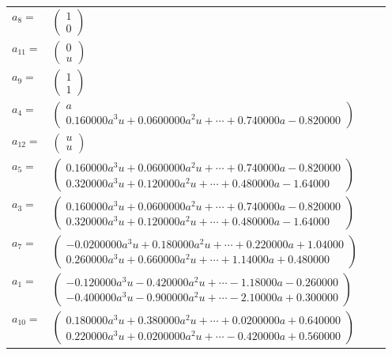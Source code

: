 \documentclass[1p]{elsarticle_modified}
\theoremstyle{definition}
\begin{document}
\begin{tabular}{m{7pt} m{180pt} m{7pt} m{180pt} }
\flushright $a_{8}=$&$\begin{pmatrix}1\\0\end{pmatrix}$ \\
\flushright $a_{11}=$&$\begin{pmatrix}0\\u\end{pmatrix}$ \\
\flushright $a_{9}=$&$\begin{pmatrix}1\\1\end{pmatrix}$ \\
\flushright $a_{4}=$&$\begin{pmatrix}a\\0.160000 a^{3} u+0.0600000 a^{2} u+\cdots+0.740000 a-0.820000\end{pmatrix}$ \\
\flushright $a_{12}=$&$\begin{pmatrix}u\\u\end{pmatrix}$ \\
\flushright $a_{5}=$&$\begin{pmatrix}0.160000 a^{3} u+0.0600000 a^{2} u+\cdots+0.740000 a-0.820000\\0.320000 a^{3} u+0.120000 a^{2} u+\cdots+0.480000 a-1.64000\end{pmatrix}$ \\
\flushright $a_{3}=$&$\begin{pmatrix}0.160000 a^{3} u+0.0600000 a^{2} u+\cdots+0.740000 a-0.820000\\0.320000 a^{3} u+0.120000 a^{2} u+\cdots+0.480000 a-1.64000\end{pmatrix}$ \\
\flushright $a_{7}=$&$\begin{pmatrix}-0.0200000 a^{3} u+0.180000 a^{2} u+\cdots+0.220000 a+1.04000\\0.260000 a^{3} u+0.660000 a^{2} u+\cdots+1.14000 a+0.480000\end{pmatrix}$ \\
\flushright $a_{1}=$&$\begin{pmatrix}-0.120000 a^{3} u-0.420000 a^{2} u+\cdots-1.18000 a-0.260000\\-0.400000 a^{3} u-0.900000 a^{2} u+\cdots-2.10000 a+0.300000\end{pmatrix}$ \\
\flushright $a_{10}=$&$\begin{pmatrix}0.180000 a^{3} u+0.380000 a^{2} u+\cdots+0.0200000 a+0.640000\\0.220000 a^{3} u+0.0200000 a^{2} u+\cdots-0.420000 a+0.560000\end{pmatrix}$ \\

\end{tabular}
\end{document}

